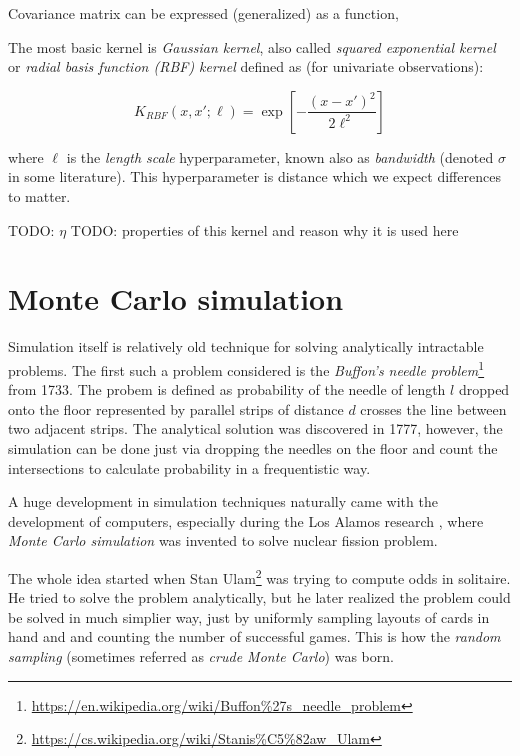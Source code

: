 \documentclass[
  digital, %
  oneside, %
  lof,     %
  lot,     %
]{fithesis4}
\begin{document}
Covariance matrix can be expressed (generalized)
as a function,

The most basic kernel is \textit{Gaussian kernel}, 
also called \textit{squared exponential kernel} or 
\textit{radial basis function (RBF) kernel} defined as
(for univariate observations):

\begin{equation}
K_{RBF} \left( x, x'; \ell \right) = \exp \left[ -\frac{(x - x')^2}{2\ell^2} \right]
\end{equation}

where $\ell$ is the \textit{length scale} hyperparameter, 
known also as \textit{bandwidth} (denoted $\sigma$ in some literature). 
This hyperparameter is distance which we expect 
differences to matter.

TODO: $\eta$
TODO: properties of this kernel and reason why it is used here


\section{Monte Carlo simulation}
\label{sec:monte-carlo}

Simulation itself is relatively old technique for 
solving analytically intractable problems. 
The first such a problem considered is the 
\textit{Buffon's needle problem}\footnote{\url{https://en.wikipedia.org/wiki/Buffon\%27s_needle_problem}} from 1733. 
The probem is defined as probability of the 
needle of length $l$ dropped onto the floor 
represented by parallel strips of distance 
$d$ crosses the line between two adjacent 
strips. 
The analytical solution was discovered in 1777, 
however, the simulation can be done just via 
dropping the needles on the floor and count 
the intersections to calculate probability 
in a frequentistic way.

A huge development in simulation techniques 
naturally came with the development of computers, 
especially during the Los Alamos research 
\cite{metropolis1987}, where 
\textit{Monte Carlo simulation} was invented to 
solve nuclear fission problem.

The whole idea started when Stan Ulam\footnote{\url{https://cs.wikipedia.org/wiki/Stanis\%C5\%82aw_Ulam}} was
trying to compute odds in solitaire.
He tried to solve the problem analytically, but he later
realized the problem could be solved in much simplier way,
just by uniformly sampling layouts of cards in hand and
and counting the number of successful games.
This is how the \textit{random sampling} 
(sometimes referred as \textit{crude Monte Carlo}) was born.
\end{document}

